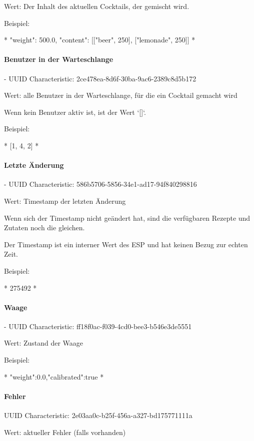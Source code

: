 	Wert: Der Inhalt des aktuellen Cocktails, der gemischt wird.
	
	Beispiel:
	
	*
	{"weight": 500.0, "content": [["beer", 250], ["lemonade", 250]]}
	*
	
\paragraph{Benutzer in der Warteschlange}
	
	- UUID Characteristic: 2ce478ea-8d6f-30ba-9ac6-2389c8d5b172
	
	Wert: alle Benutzer in der Warteschlange, für die ein Cocktail gemacht wird
	
	Wenn kein Benutzer aktiv ist, ist der Wert `[]`.
	
	Beispiel:
	
	*
	[1, 4, 2]
	*
	
\paragraph{Letzte Änderung}
	
	- UUID Characteristic: 586b5706-5856-34e1-ad17-94f840298816
	
	Wert: Timestamp der letzten Änderung
	
	Wenn sich der Timestamp nicht geändert hat, sind die verfügbaren Rezepte und Zutaten noch die gleichen.
	
	Der Timestamp ist ein interner Wert des ESP und hat keinen Bezug zur echten Zeit.
	
	Beispiel:
	
	*
	275492
	*
	
\paragraph{Waage}
	
	- UUID Characteristic: ff18f0ac-f039-4cd0-bee3-b546e3de5551
	
	Wert: Zustand der Waage
	
	Beispiel:
	
	*
	{"weight":0.0,"calibrated":true}
	*
	
\paragraph{Fehler}
	
UUID Characteristic: 2e03aa0c-b25f-456a-a327-bd175771111a
	
	Wert: aktueller Fehler (falls vorhanden)
	
